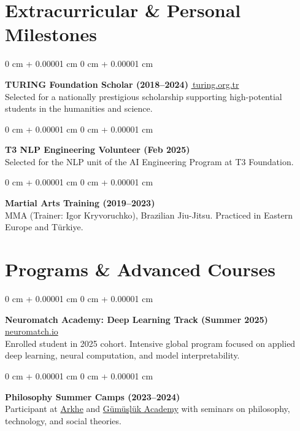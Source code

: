 \documentclass[10pt, letterpaper]{article}
\newenvironment{onecolentry}{
    \begin{adjustwidth}{
        0 cm + 0.00001 cm
    }{
        0 cm + 0.00001 cm
    }
}{
    \end{adjustwidth}
} %
\begin{document}
\section{Extracurricular \& Personal Milestones}

\begin{onecolentry}
    \textbf{TURING Foundation Scholar (2018–2024)} \hfill \href{https://turing.org.tr/}{\faLink\,turing.org.tr} \\
    Selected for a nationally prestigious scholarship supporting high-potential students in the humanities and science.
\end{onecolentry}
\vspace{0.15cm}

\begin{onecolentry}
    \textbf{T3 NLP Engineering Volunteer (Feb 2025)} \\
    Selected for the NLP unit of the AI Engineering Program at T3 Foundation.
\end{onecolentry}
\vspace{0.15cm}

\begin{onecolentry}
    \textbf{Martial Arts Training (2019–2023)} \\
    MMA (Trainer: Igor Kryvoruchko), Brazilian Jiu-Jitsu. Practiced in Eastern Europe and Türkiye.
\end{onecolentry}
\vspace{0.15cm}

\section{Programs \& Advanced Courses}

\begin{onecolentry}
    \textbf{Neuromatch Academy: Deep Learning Track (Summer 2025)} \hfill \small\textcolor{gray}{\href{https://academy.neuromatch.io/}{neuromatch.io}} \\
    Enrolled student in 2025 cohort. Intensive global program focused on applied deep learning, neural computation, and model interpretability.
\end{onecolentry}
\vspace{0.15cm}

\begin{onecolentry}
    \textbf{Philosophy Summer Camps (2023–2024)} \\
    Participant at \href{https://archeprojesi.com/}{Arkhe} and \href{https://www.gumuslukakademisi.org/en}{Gümüşlük Academy} with seminars on philosophy, technology, and social theories.
\end{onecolentry}
\end{document}
